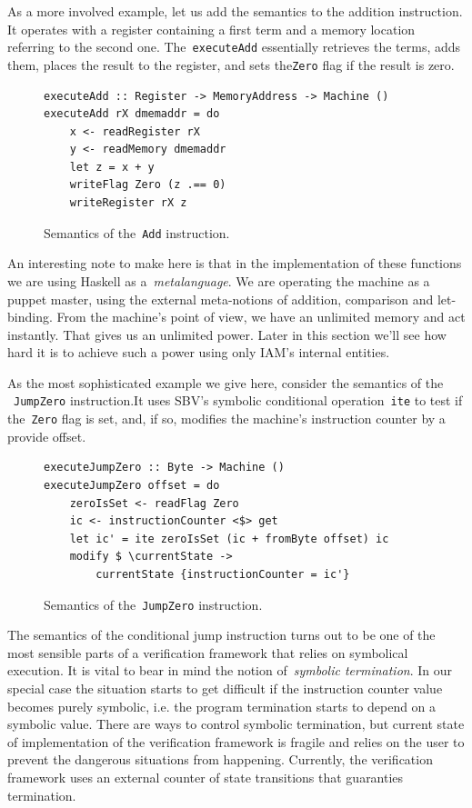 As a more involved example, let us add the semantics to the addition instruction.
It operates with a register containing a first term and a memory location referring
to the second one. The~\texttt{executeAdd} essentially retrieves the terms,
adds them, places the result to the register, and sets the\texttt{Zero}
flag if the result is zero.

\begin{figure}[H]
\begin{verbatim}
executeAdd :: Register -> MemoryAddress -> Machine ()
executeAdd rX dmemaddr = do
    x <- readRegister rX
    y <- readMemory dmemaddr
    let z = x + y
    writeFlag Zero (z .== 0)
    writeRegister rX z
\end{verbatim}
\caption{Semantics of the~\texttt{Add} instruction.}
\label{addSemantics}
\end{figure}

An interesting note to make here is that in the implementation of these functions
we are using Haskell as a~\emph{metalanguage}. We are operating the machine as
a puppet master, using the external meta-notions of addition, comparison and let-binding.
From the machine's point of view, we have an unlimited memory and act instantly.
That gives us an unlimited power. Later in this section we'll see how hard it is
to achieve such a power using only IAM's internal entities.

As the most sophisticated example we give here, consider the semantics of the
~\texttt{JumpZero} instruction.It uses SBV's symbolic conditional
operation~\texttt{ite} to test if the~\texttt{Zero} flag
is set, and, if so, modifies the machine's instruction counter by a provide offset.

\begin{figure}[H]
\begin{verbatim}
executeJumpZero :: Byte -> Machine ()
executeJumpZero offset = do
    zeroIsSet <- readFlag Zero
    ic <- instructionCounter <$> get
    let ic' = ite zeroIsSet (ic + fromByte offset) ic
    modify $ \currentState ->
        currentState {instructionCounter = ic'}
\end{verbatim}
\caption{Semantics of the~\texttt{JumpZero} instruction.}
\label{jumpZeroSemantics}
\end{figure}

The semantics of the conditional jump instruction turns out to be one of the
most sensible parts of a verification framework that relies on symbolical execution.
It is vital to bear in mind the notion of~\emph{symbolic termination}. In our special
case the situation starts to get difficult if the instruction counter value becomes
purely symbolic, i.e. the program termination starts to depend on a symbolic value.
There are ways to control symbolic termination, but current state of implementation of
the verification framework is fragile and relies on the user to prevent the dangerous
situations from happening. Currently, the verification framework uses an external
counter of state transitions that guaranties termination.

